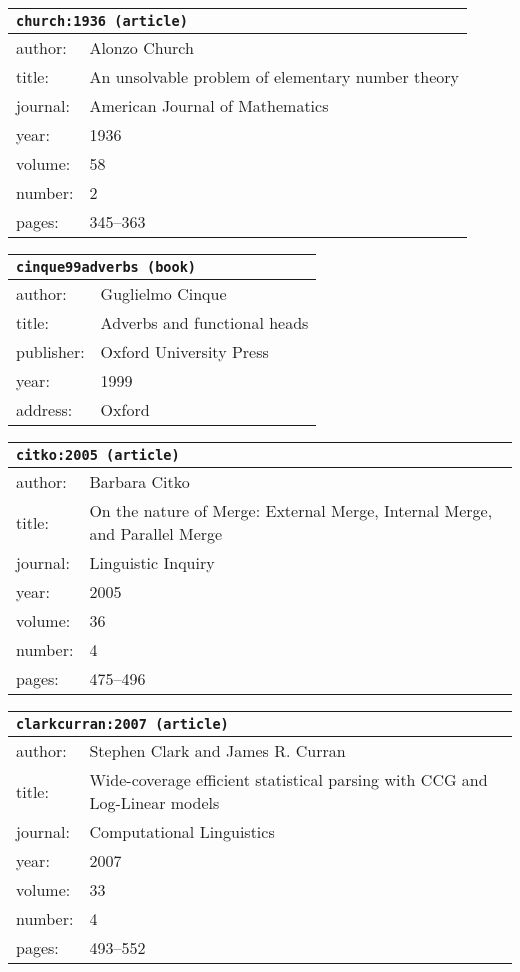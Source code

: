 \documentclass{article}
\begin{document}
\bigskip

\begin{tabular}{p{}p{}}
\multicolumn{2}{l}{\texttt{church:1936 (article)}}\\
\hline
author: & Alonzo Church\\
title: & An unsolvable problem of elementary number theory\\
journal: & American Journal of Mathematics\\
year: & 1936\\
volume: & 58\\
number: & 2\\
pages: & 345--363\\
\end{tabular}

\bigskip

\begin{tabular}{p{}p{}}
\multicolumn{2}{l}{\texttt{cinque99adverbs (book)}}\\
\hline
author: & Guglielmo Cinque\\
title: & Adverbs and functional heads\\
publisher: & Oxford University Press\\
year: & 1999\\
address: & Oxford\\
\end{tabular}

\bigskip

\begin{tabular}{p{}p{}}
\multicolumn{2}{l}{\texttt{citko:2005 (article)}}\\
\hline
author: & Barbara Citko\\
title: & On the nature of Merge: External Merge, Internal Merge, and Parallel Merge\\
journal: & Linguistic Inquiry\\
year: & 2005\\
volume: & 36\\
number: & 4\\
pages: & 475--496\\
\end{tabular}

\bigskip

\begin{tabular}{p{}p{}}
\multicolumn{2}{l}{\texttt{clarkcurran:2007 (article)}}\\
\hline
author: & Stephen Clark and James R. Curran\\
title: & Wide-coverage efficient statistical parsing with CCG and Log-Linear models\\
journal: & Computational Linguistics\\
year: & 2007\\
volume: & 33\\
number: & 4\\
pages: & 493--552\\
\end{tabular}
\end{document}
